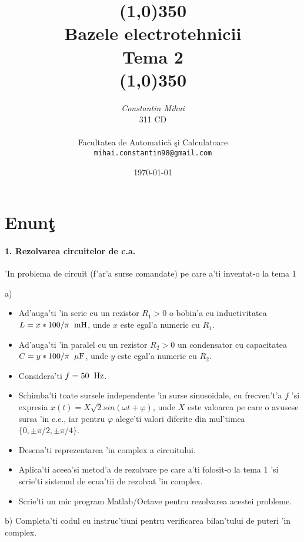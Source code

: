 \documentclass[titlepage, a4paper,12pt]{article}
\title{\line(1,0){350}\\ \Huge Bazele electrotehnicii \\ 
\huge Tema 2 \\
\line(1,0){350}
}
\author{{\em \Large Constantin Mihai} \\
\large 311 CD \\ \\
{\large Facultatea de Automatic\u{a} \c{s}i Calculatoare} \\
\large \texttt{mihai.constantin98@gmail.com} 
}
\date{\today}
\newcommand\spatiu[1][0.2cm]{\hspace*{#1}} %
\begin{document}

\maketitle



\tableofcontents

\newpage

\section*{Enun\c{t}}

\paragraph{1. Rezolvarea circuitelor de c.a.} \mbox{} 

'In problema de circuit (f'ar'a surse comandate) pe care a'ti inventat-o la tema 1

a) \begin{itemize}
  \item Ad'auga'ti 'in serie cu un rezistor $R_1>0$ o bobin'a cu inductivitatea $L=x*100/\pi\spatiu\mathrm{mH}$, unde $x$ este egal'a numeric cu $R_1$.
  \item Ad'auga'ti 'in paralel cu un rezistor $R_2>0$ un condensator cu capacitatea $C=y*100/\pi \spatiu\mu\mathrm{F}$, unde $y$ este egal'a numeric cu $R_2$.
  \item Considera'ti $f=50\spatiu\mathrm{Hz}$.
  \item Schimba'ti toate sursele independente 'in surse sinusoidale, cu frecven't'a $f$ 'si expresia $x(t)=X\sqrt{2}sin(\omega t+\varphi)$, unde $X$ este valoarea pe care o avusese sursa 'in c.c., iar pentru $\varphi$ alege'ti valori diferite din mul'timea $\big\{0,\pm\pi/2,\pm\pi/4\big\}$.
  \item Desena'ti reprezentarea 'in complex a circuitului.
  \item Aplica'ti aceea'si metod'a de rezolvare pe care a'ti folosit-o la tema 1 'si scrie'ti sistemul de ecua'tii de rezolvat 'in complex.
  \item Scrie'ti un mic program Matlab/Octave pentru rezolvarea acestei probleme.
\end{itemize}

b) Completa'ti codul cu instruc'tiuni pentru verificarea bilan'tului de puteri 'in complex. \\ \par
\end{document}
